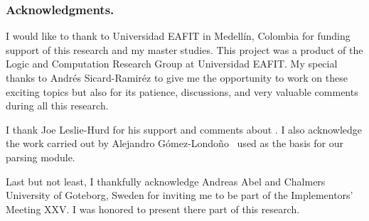 \documentclass[../main.tex]{subfiles}
\begin{document}

\subsubsection*{Acknowledgments.}

I would like to thank to Universidad EAFIT in Medell\'in, Colombia for funding
support of this research and my master studies.
This project was a product of the Logic and Computation
Research Group at Universidad EAFIT.
My special thanks to Andrés Sicard-Ramiréz to give me the opportunity
to work on these exciting topics but also for its patience, discussions,
and very valuable comments during all this research.

I thank Joe Leslie-Hurd for his support and comments about \Metis.
I also acknowledge the work carried out by Alejandro
G\'omez-Londo\~no~\cite{Gomez-Londono2015} used as the basis
for our \TSTP parsing module.

Last but not least, I thankfully acknowledge
Andreas Abel and Chalmers University of Goteborg, Sweden for
inviting me to be part of the \Agda Implementors’ Meeting XXV.
I was honored to present there part of this research.
\end{document}
